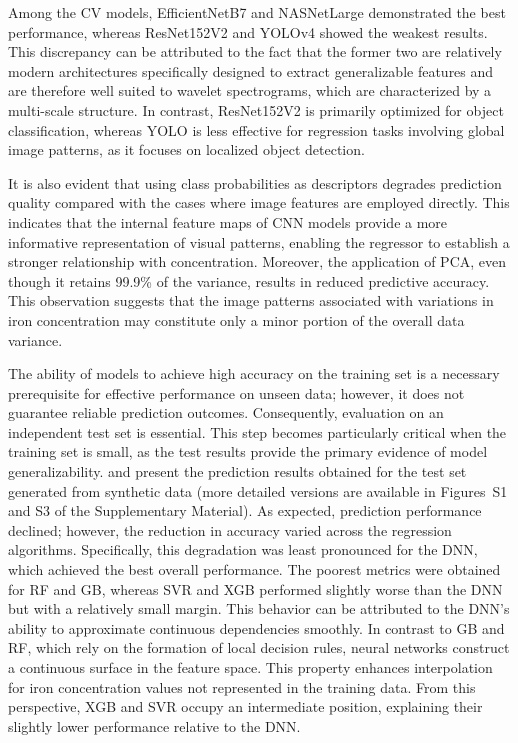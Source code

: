 \documentclass[10pt]{iopart}
\begin{document}
Among the CV models, EfficientNetB7 and NASNetLarge demonstrated the best performance,
whereas ResNet152V2 and YOLOv4 showed the weakest results.
This discrepancy can be attributed to the fact that the former two are relatively modern architectures
specifically designed to extract generalizable features and are therefore well suited to wavelet spectrograms,
which are characterized by a multi-scale structure.
In contrast, ResNet152V2 is primarily optimized for object classification, whereas YOLO is less effective for regression
tasks involving global image patterns, as it focuses on localized object detection.

It is also evident that using class probabilities as descriptors degrades prediction quality
compared with the cases where image features are employed directly.
This indicates that the internal feature maps of CNN models provide a more informative representation of visual patterns,
enabling the regressor to establish a stronger relationship with concentration.
Moreover, the application of PCA, even though it retains 99.9\% of the variance, results in reduced predictive accuracy.
This observation suggests that the image patterns associated with variations in iron concentration may constitute
only a minor portion of the overall data variance.

The ability of models to achieve high accuracy on the training set is a necessary prerequisite for effective performance on unseen data;
however, it does not guarantee reliable prediction outcomes.
Consequently, evaluation on an independent test set is essential.
This step becomes particularly critical when the training set is small, as the test results provide the primary evidence of model generalizability.
 and  present the prediction results obtained for the test set generated from synthetic data
(more detailed versions are available in Figures~S1 and S3 of the Supplementary Material).
As expected, prediction performance declined; however, the reduction in accuracy varied across the regression algorithms.
Specifically, this degradation was least pronounced for the DNN, which achieved the best overall performance.
The poorest metrics were obtained for RF and GB, whereas SVR and XGB performed slightly worse than the DNN but with a relatively small margin.
This behavior can be attributed to the DNN’s ability to approximate continuous dependencies smoothly.
In contrast to GB and RF, which rely on the formation of local decision rules,
neural networks construct a continuous surface in the feature space.
This property enhances interpolation for iron concentration values not represented in the training data.
From this perspective, XGB and SVR occupy an intermediate position, explaining their slightly lower performance relative to the DNN.
\end{document}
